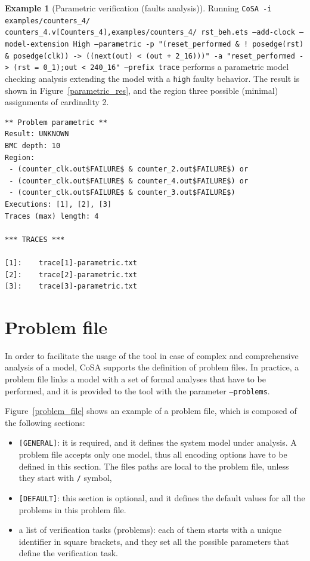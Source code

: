 \documentclass{article}
\theoremstyle{definition}
\newtheorem{example}{Example}[section]
\begin{document}
\begin{example}[Parametric verification (faults analysis)]
\label{ex:param_extended}
  Running \texttt{CoSA -i
    examples/counters\_4/\\counters\_4.v[Counters\_4],examples/counters\_4/
    rst\_beh.ets --add-clock --model-extension High --parametric -p
    "(reset\_performed \& ! posedge(rst) \& posedge(clk))
    -> ((next(out) < (out + 2\_16)))" -a "reset\_performed -> (rst =
    0\_1);out < 240\_16" --prefix trace} performs a parametric model
  checking analysis extending the model with a \texttt{high} faulty
  behavior. The result is shown in Figure~\ref{parametric_res}, and
  the region three possible (minimal) assignments of cardinality 2.

\begin{lstlisting}[frame=single,language=ets,caption=Parametric analysis example,label=parametric_res]
** Problem parametric **
Result: UNKNOWN
BMC depth: 10
Region:
 - (counter_clk.out$FAILURE$ & counter_2.out$FAILURE$) or 
 - (counter_clk.out$FAILURE$ & counter_4.out$FAILURE$) or 
 - (counter_clk.out$FAILURE$ & counter_3.out$FAILURE$)
Executions: [1], [2], [3]
Traces (max) length: 4

*** TRACES ***

[1]:	trace[1]-parametric.txt
[2]:	trace[2]-parametric.txt
[3]:	trace[3]-parametric.txt
\end{lstlisting}

\end{example}

\section{Problem file}
\label{sec:problem_file}

In order to facilitate the usage of the tool in case of complex and
comprehensive analysis of a model, CoSA supports the definition of
problem files. In practice, a problem file links a model with a set of
formal analyses that have to be performed, and it is provided to the
tool with the parameter \texttt{--problems}.

Figure~\ref{problem_file} shows an example of a problem file, which is
composed of the following sections:
\begin{itemize}
\item \texttt{[GENERAL]}: it is required, and it defines the system
  model under analysis. A problem file accepts only one model, thus
  all encoding options have to be defined in this section. The files
  paths are local to the problem file, unless they start with
  \texttt{/} symbol,
\item \texttt{[DEFAULT]}: this section is optional, and it defines the
  default values for all the problems in this problem file.
\item a list of verification tasks (problems): each of them starts with a unique
  identifier in square brackets, and they set all the possible parameters that
  define the verification task.
\end{itemize}
\end{document}
